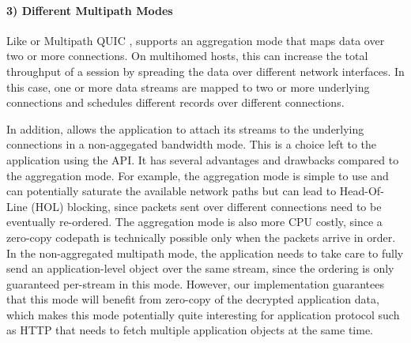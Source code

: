 \paragraph*{3) Different Multipath Modes}
Like \mptcp \cite{raiciu2012hard,rfc6824} or Multipath QUIC \cite{viernickel2018multipath,de2017multipath,draft-deconinck-quic-multipath-06,draft-liu-multipath-quic-02}, \tcpls supports an aggregation mode that maps data over two or more \tcp connections. On multihomed hosts, this can increase the total throughput of a \tcpls session by spreading the data over different network interfaces. In this case, one or more data streams are mapped to two or more underlying \tcp connections and \tcpls schedules different records over different connections.

In addition, \tcpls allows the application to attach its streams to the
underlying \tcp connections in a non-aggegated bandwidth mode. This is a choice left to the application using the API. It has several advantages and drawbacks compared to the aggregation mode. For example, the aggregation mode is simple to use and can potentially saturate the available network paths but can lead to Head-Of-Line (HOL) blocking, since packets sent over different \tcp connections need to be eventually re-ordered. The aggregation mode is also more CPU costly, since a zero-copy codepath is technically possible only when the packets arrive in order. In the non-aggregated multipath mode, the application needs to take care to fully send an application-level object over the same stream, since the ordering is only guaranteed per-stream in this mode. However, our \tcpls implementation guarantees that this mode will benefit from zero-copy of the decrypted application data, which makes this mode potentially quite interesting for application protocol such as HTTP that needs to fetch multiple application objects at the same time.

